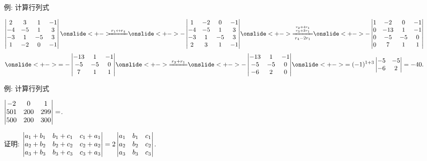 \begin{frame}{例: 计算行列式}
	\onslide<+->
	\begin{example}
		\[\detm{
			 2& 3& 1&-1\\
			-4&-5& 1& 3\\
			-3& 1&-5& 3\\
			 1&-2& 0&-1}
		\onslide<+->{\hspace{-2mm}\xeq{r_1\swap r_4}}
		\onslide<+->{-\detm{
			1&-2& 0&-1\\
		 -4&-5& 1& 3\\
		 -3& 1&-5& 3\\
		  2& 3& 1&-1}}
		\onslide<+->{\xeq[r_4-2r_1]{r_2+4r_1\atop r_3+3r_1}}
		\onslide<+->{-\detm{
			1&-2& 0&-1\\
		  0&-13& 1&-1\\
		  0&-5&-5&0\\
		  0& 7& 1&1}}
		\]
		\[\onslide<+->{=-\detm{
				-13& 1&-1\\
				-5&-5&0\\
				 7& 1&1}}
			\onslide<+->{\xeq{r_3+r_1}}
		\onslide<+->{-\detm{
			-13& 1&-1\\
			-5&-5&0\\
			-6& 2&0}}
		\onslide<+->{=(-1)^{1+3}\detm{-5&-5\\-6&2}=-40.}
		\]
	\end{example}
\end{frame}


\begin{frame}{例: 计算行列式}
	\onslide<+->
	\begin{exercise}
		$\left|\begin{matrix}-2&0&1\\
		501&200&299\\
		500&200&300\end{matrix}\right|=$.
	\end{exercise}
	\onslide<+->
	\begin{example}
		证明:
		$\left|\begin{matrix}
			a_1+b_1&b_1+c_1&c_1+a_1\\
			a_2+b_2&b_2+c_2&c_2+a_2\\
			a_3+b_3&b_3+c_3&c_3+a_3
		\end{matrix}\right|=2\left|\begin{matrix}
			a_1&b_1&c_1\\
			a_2&b_2&c_2\\
			a_3&b_3&c_3
		\end{matrix}\right|$.
	\end{example}
\end{frame}


